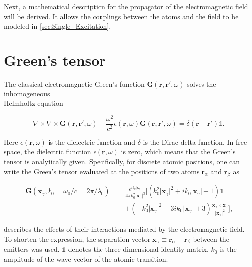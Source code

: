 \noindent
Next, a mathematical description for the propagator of the electromagnetic field will be derived.
It allows the couplings between the atoms and the field to be modeled in \autoref{sec:Single_Excitation}.



\section{Green's tensor} \label{sec:Green_tensor}
The classical electromagnetic Green's function $\mathbf{G}(\mathbf{r}, \mathbf{r}', \omega)$ solves the inhomogeneous \\Helmholtz equation \cite{Asenjo-Garcia2017}

\begin{equation} \label{eq:Green_Defining_prop}
\nabla \times \nabla \times \mathbf{G}(\mathbf{r}, \mathbf{r}', \omega) -
\frac{\omega^2}{c^2} \epsilon(\mathbf{r}, \omega) \mathbf{G}(\mathbf{r}, \mathbf{r}', \omega) = \delta(\mathbf{r} - \mathbf{r}') \mathbb{1} \text{.}
\end{equation}

\noindent
Here $\epsilon(\mathbf{r}, \omega)$ is the dielectric function and $\delta$ is the Dirac delta function.
In free space, the dielectric function $\epsilon(\mathbf{r},\omega)$ is zero, which means that the Green's tensor is analytically given.
Specifically, for discrete atomic positions, one can write the Green's tensor evaluated at the positions of two atoms $\mathbf{r}_\alpha$ and $\mathbf{r}_\beta$ as

\begin{align} \label{eq:Green_vacc}
    \mathbf{G}(\mathbf{x}_\gamma, k_0 = \omega_0 / c = 2\pi / \lambda_0) = &
    \frac{e^{ik_0 \vert\mathbf{x}_\gamma\vert}}{4\pi k_0^2 \vert\mathbf{x}_\gamma\vert^3} \bigg[
    \left(k_0^2 \vert\mathbf{x}_\gamma\vert^2 + ik_0 \vert\mathbf{x}_\gamma\vert - 1\right) \mathbb{1} \nonumber \\
    & + \left(-k_0^2 \vert\mathbf{x}_\gamma\vert^2 - 3ik_0 \vert\mathbf{x}_\gamma\vert + 3 \right)
    \frac{\mathbf{x}_\gamma \times \mathbf{x}_\gamma}{\vert\mathbf{x}_\gamma\vert^2} \bigg] \text{,}
\end{align}

\noindent
describes the effects of their interactions mediated by the electromagnetic field.
To shorten the expression,
the separation vector $\mathbf{x}_\gamma \equiv \mathbf{r}_\alpha - \mathbf{r}_\beta$ between the emitters was used.
$\mathbb{1}$ denotes the three-dimensional identity matrix.
$k_0$ is the amplitude of the wave vector of the atomic transition.


